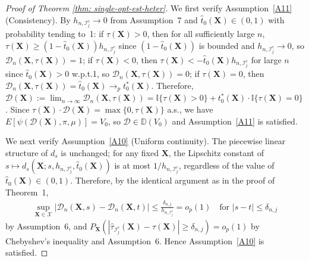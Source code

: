 \documentclass[11pt]{article}
\theoremstyle{referenceplain}
\theoremstyle{referencedefinition}
\theoremstyle{referenceremark}
\begin{document}
\begin{proof}[Proof of Theorem \ref{thm: single-opt-est-heter}]
    We first verify Assumption~\ref{A11} (Consistency). 
    By $h_{n,\mathcal{I}_j^c}\to 0$ from Assumption~7 
    and $\widehat{t}_0(\mathbf{X})\in(0,1)$ with 
    probability tending to~1: if $\tau(\mathbf{X})>0$, 
    then for all sufficiently large $n$, 
    $\tau(\mathbf{X})
    \ge(1-\widehat{t}_0(\mathbf{X}))h_{n,\mathcal{I}_j^c}$ 
    since $(1-\widehat{t}_0(\mathbf{X}))$ is bounded 
    and $h_{n,\mathcal{I}_j^c}\to 0$, so 
    $\mathcal{D}_n(\mathbf{X},\tau(\mathbf{X}))=1$; 
    if $\tau(\mathbf{X})<0$, then 
    $\tau(\mathbf{X})
    <-\widehat{t}_0(\mathbf{X})h_{n,\mathcal{I}_j^c}$ 
    for large $n$ since $\widehat{t}_0(\mathbf{X})>0$ 
    w.p.t.1, so 
    $\mathcal{D}_n(\mathbf{X},\tau(\mathbf{X}))=0$; 
    if $\tau(\mathbf{X})=0$, then 
    $\mathcal{D}_n(\mathbf{X},\tau(\mathbf{X}))
    =\widehat{t}_0(\mathbf{X})
    \to_p t_0^*(\mathbf{X})$. 
    Therefore, 
    $\mathcal{D}(\mathbf{X})
    :=\lim_{n\to\infty}
    \mathcal{D}_n(\mathbf{X},\tau(\mathbf{X}))
    =\mathbb{I}\{\tau(\mathbf{X})>0\}
    +t_0^*(\mathbf{X})\cdot
    \mathbb{I}\{\tau(\mathbf{X})=0\}$. 
    Since $\tau(\mathbf{X})\cdot\mathcal{D}(\mathbf{X})
    =\max\{0,\tau(\mathbf{X})\}$ a.s., we have 
    $E[\psi(\mathcal{D}(\mathbf{X}),\pi,\mu)]=V_0$, 
    so $\mathcal{D}\in\mathbb{D}(V_0)$ and 
    Assumption~\ref{A11} is satisfied.

    We next verify Assumption~\ref{A10} 
    (Uniform continuity). The piecewise linear 
    structure of $d_s$ is unchanged; for any fixed 
    $\mathbf{X}$, the Lipschitz constant of 
    $s\mapsto d_s(\mathbf{X};s,h_{n,\mathcal{I}_j^c},
    \widehat{t}_0(\mathbf{X}))$ is at most 
    $1/h_{n,\mathcal{I}_j^c}$, regardless of the 
    value of $\widehat{t}_0(\mathbf{X})\in(0,1)$. 
    Therefore, by the identical argument as in the 
    proof of Theorem~1,
    \begin{align*}
        \sup_{\mathbf{X}\in\mathcal{X}}
        |\mathcal{D}_n(\mathbf{X},s)
        -\mathcal{D}_n(\mathbf{X},t)|
        \leq \frac{{\delta_{n,j}}}{h_{n,\mathcal{I}_j^c}}
        =o_p(1)
        \quad\text{for }|s-t|\leq{\delta_{n,j}}
    \end{align*}
    by Assumption~6, and 
    $P_{\mathbf{X}}(|\widehat{\tau}_{\mathcal{I}_j^c}
    (\mathbf{X})-\tau(\mathbf{X})|\ge{\delta_{n,j}})=o_p(1)$ 
    by Chebyshev's inequality and Assumption~6. Hence 
    Assumption~\ref{A10} is satisfied.


\end{proof}
\end{document}
